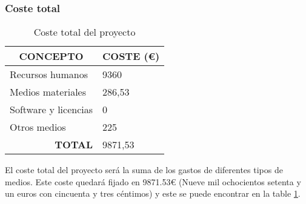\subsubsection{Coste total}
\begin{table}[htp!]
\centering
\caption{Coste total del proyecto}
\label{costeTotal}
\begin{tabular}{|l|l|}
\hline
\multicolumn{1}{|c|}{\textbf{CONCEPTO}} & \multicolumn{1}{c|}{\textbf{COSTE (€)}} \\ \hline
Recursos humanos                        & 9360                                    \\ \hline
Medios materiales                       & 286,53                                  \\ \hline
Software y licencias                    & 0                                       \\ \hline
Otros medios                            & 225                                     \\ \hline
\multicolumn{1}{|r|}{\textbf{TOTAL}}    & 9871,53                                 \\ \hline
\end{tabular}
\end{table}

El coste total del proyecto será la suma de los gastos de diferentes tipos de medios. Este coste quedará fijado en 9871.53€ (Nueve mil ochocientos setenta y un euros con cincuenta y tres céntimos) y este se puede encontrar en la table \ref{costeTotal}.